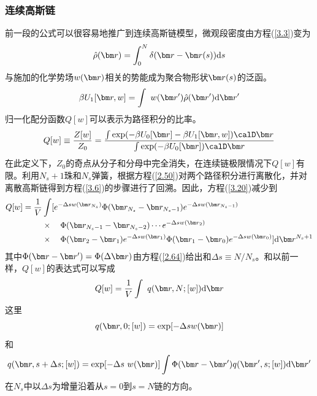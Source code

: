 \subsubsection{连续高斯链}
前一段的公式可以很容易地推广到连续高斯链模型，微观段密度由方程(\ref{3.3})变为
\begin{equation}\label{3.18}
\hat{\rho}(\br)=\int_0^N\delta(\br-\br(s))\mathrm{d}s
\end{equation}
与施加的化学势场$w(\br)$相关的势能成为聚合物形状$\br(s)$的泛函。
\begin{equation}\label{3.19}
\beta U_1[\br,w]=\int~w(\br')\hat{\rho}(\br')\mathrm{d}\br'
\end{equation}
归一化配分函数$Q[w]$可以表示为路径积分的比率。
\begin{equation}\label{3.20}
Q[w]\equiv\frac{Z[w]}{Z_0}=\frac{\int\exp(-\beta U_0[\br]-\beta U_1[\br,w])\calD\br}{\int\exp(-\beta U_0[\br])\calD\br}
\end{equation}
在此定义下，$Z_0$的奇点从分子和分母中完全消失，在连续链极限情况下$Q[w]$有限。利用$N_s+1$珠和$N_s$弹簧，根据方程(\ref{2.50})对两个路径积分进行离散化，并对离散高斯链得到方程(\ref{3.6})的步骤进行了回溯。因此，方程(\ref{3.20})减少到
\begin{equation}\label{3.21}
\begin{aligned}
Q[w]=\frac{1}{V}&\int[e^{-\Delta sw(\br_{N_s})}\Phi(\br_{N_s}-\br_{N_s-1})e^{-\Delta sw(\br_{N_s-1})}\\
&\times\quad\Phi(\br_{N_s-1}-\br_{N_s-2})\cdots e^{-\Delta sw(\br_2)}\\
&\times\quad\Phi(\br_2-\br_1)e^{-\Delta sw(\br_1)}\Phi(\br_1-\br_0)e^{-\Delta sw(\br_0)}]\mathrm{d}\br^{N_s+1}
\end{aligned}
\end{equation}
其中$\Phi(\br-\br')=\Phi(\Delta\br)$由方程(\ref{2.64})给出和$\Delta s\equiv N/N_s$。和以前一样，$Q[w]$的表达式可以写成
\begin{equation}\label{3.22}
Q[w]=\frac{1}{V}\int~q(\br,N;[w])\mathrm{d}\br
\end{equation}
这里
\begin{equation}\label{3.23}
q(\br,0;[w])=\exp[-\Delta sw(\br)]
\end{equation}
和
\begin{equation}\label{3.24}
q(\br,s+\Delta s;[w])=\exp[-\Delta s~w(\br)]\int\Phi(\br-\br')q(\br',s;[w])\mathrm{d}\br'
\end{equation}
在$N_s$中以$\Delta s$为增量沿着从$s=0$到$s=N$链的方向。

